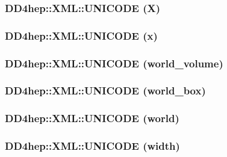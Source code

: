 \label{namespace_d_d4hep_1_1_x_m_l_a10fd1c3466ee3bf3990e323bb2c64020}
\hypertarget{namespace_d_d4hep_1_1_x_m_l_a300572f08741250a889bb63a49dc2fe8}{
\subsubsection[{UNICODE}]{\setlength{\rightskip}{0pt plus 5cm}DD4hep::XML::UNICODE (X)}}
\label{namespace_d_d4hep_1_1_x_m_l_a300572f08741250a889bb63a49dc2fe8}
\hypertarget{namespace_d_d4hep_1_1_x_m_l_aa81f798502a97a2f58baf12aad7892d0}{
\subsubsection[{UNICODE}]{\setlength{\rightskip}{0pt plus 5cm}DD4hep::XML::UNICODE (x)}}
\label{namespace_d_d4hep_1_1_x_m_l_aa81f798502a97a2f58baf12aad7892d0}
\hypertarget{namespace_d_d4hep_1_1_x_m_l_a22a545538ae3b5ec429edc6def4b4a30}{
\subsubsection[{UNICODE}]{\setlength{\rightskip}{0pt plus 5cm}DD4hep::XML::UNICODE (world\_\-volume)}}
\label{namespace_d_d4hep_1_1_x_m_l_a22a545538ae3b5ec429edc6def4b4a30}
\hypertarget{namespace_d_d4hep_1_1_x_m_l_a1058f369b75341da0d644e9548dcfa30}{
\subsubsection[{UNICODE}]{\setlength{\rightskip}{0pt plus 5cm}DD4hep::XML::UNICODE (world\_\-box)}}
\label{namespace_d_d4hep_1_1_x_m_l_a1058f369b75341da0d644e9548dcfa30}
\hypertarget{namespace_d_d4hep_1_1_x_m_l_ae94c683fa69273318b6d476f3284bd5b}{
\subsubsection[{UNICODE}]{\setlength{\rightskip}{0pt plus 5cm}DD4hep::XML::UNICODE (world)}}
\label{namespace_d_d4hep_1_1_x_m_l_ae94c683fa69273318b6d476f3284bd5b}
\hypertarget{namespace_d_d4hep_1_1_x_m_l_a0d1ef7fb3901bb28fe1d8a5b6e27a0b2}{
\subsubsection[{UNICODE}]{\setlength{\rightskip}{0pt plus 5cm}DD4hep::XML::UNICODE (width)}}
